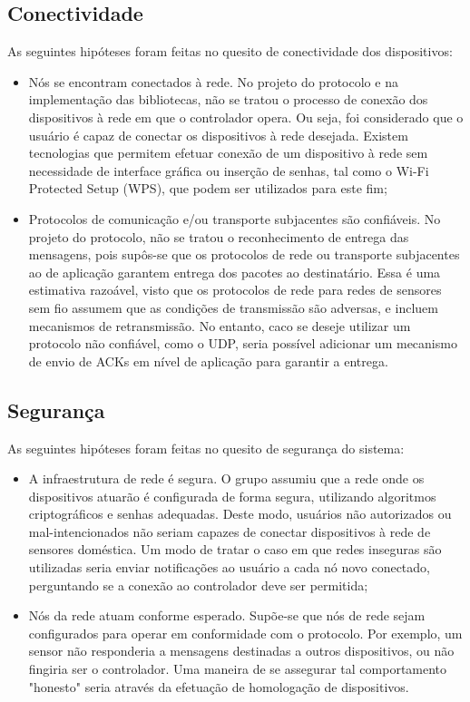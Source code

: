 \subsection{Conectividade} \label{subsec:limit_conectividade}
As seguintes hipóteses foram feitas no quesito de conectividade dos dispositivos:
\begin{itemize}
	\item Nós se encontram conectados à rede. No projeto do protocolo e na implementação das bibliotecas, não se tratou o processo de conexão dos dispositivos à rede em que o controlador opera. Ou seja, foi considerado que o usuário é capaz de conectar os dispositivos à rede desejada. Existem tecnologias que permitem efetuar conexão de um dispositivo à rede sem necessidade de interface gráfica ou inserção de senhas, tal como o Wi-Fi Protected Setup (WPS), que podem ser utilizados para este fim;
	\item Protocolos de comunicação e/ou transporte subjacentes são confiáveis. No projeto do protocolo, não se tratou o reconhecimento de entrega das mensagens, pois supôs-se que os protocolos de rede ou transporte subjacentes ao de aplicação garantem entrega dos pacotes ao destinatário. Essa é uma estimativa razoável, visto que os protocolos de rede para redes de sensores sem fio assumem que as condições de transmissão são adversas, e incluem mecanismos de retransmissão. No entanto, caco se deseje utilizar um protocolo não confiável, como o UDP, seria possível adicionar um mecanismo de envio de ACKs em nível de aplicação para garantir a entrega.
\end{itemize}

\subsection{Segurança} \label{subsec:limit_seguranca}
As seguintes hipóteses foram feitas no quesito de segurança do sistema:
\begin{itemize}
	\item A infraestrutura de rede é segura. O grupo assumiu que a rede onde os dispositivos atuarão é configurada de forma segura, utilizando algoritmos criptográficos e senhas adequadas. Deste modo, usuários não autorizados ou mal-intencionados não seriam capazes de conectar dispositivos à rede de sensores doméstica. Um modo de tratar o caso em que redes inseguras são utilizadas seria enviar notificações ao usuário a cada nó novo conectado, perguntando se a conexão ao controlador deve ser permitida;
	\item Nós da rede atuam conforme esperado. Supõe-se que nós de rede sejam configurados para operar em conformidade com o protocolo. Por exemplo, um sensor não responderia a mensagens destinadas a outros dispositivos, ou não fingiria ser o controlador. Uma maneira de se assegurar tal comportamento "honesto" seria através da efetuação de homologação de dispositivos.
\end{itemize}